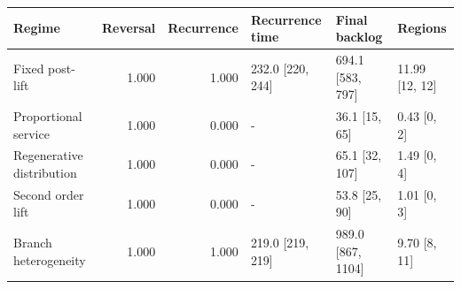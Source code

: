 \begin{tabular}{lrrlll}
\hline
Regime & Reversal & Recurrence & Recurrence time & Final backlog & Regions \\
\hline
Fixed post-lift & 1.000 & 1.000 & 232.0 [220, 244] & 694.1 [583, 797] & 11.99 [12, 12] \\
Proportional service & 1.000 & 0.000 & - & 36.1 [15, 65] & 0.43 [0, 2] \\
Regenerative distribution & 1.000 & 0.000 & - & 65.1 [32, 107] & 1.49 [0, 4] \\
Second order lift & 1.000 & 0.000 & - & 53.8 [25, 90] & 1.01 [0, 3] \\
Branch heterogeneity & 1.000 & 1.000 & 219.0 [219, 219] & 989.0 [867, 1104] & 9.70 [8, 11] \\
\hline
\end{tabular}
